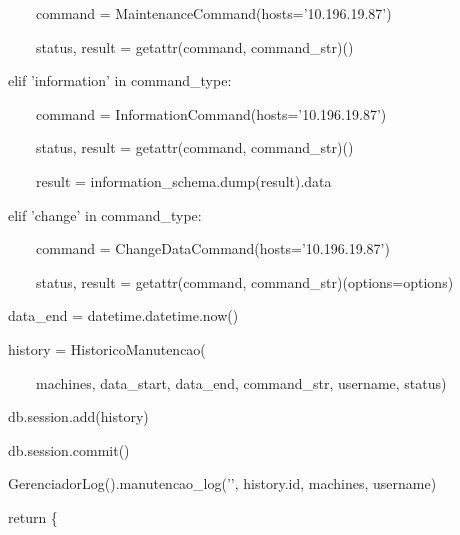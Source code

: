 {\ttfamily\color[rgb]{0.10980392,0.10980392,0.10980392}
    \ \ \ \ \ \ \ \ command = MaintenanceCommand(hosts='10.196.19.87')}

{\ttfamily\color[rgb]{0.10980392,0.10980392,0.10980392}
    \ \ \ \ \ \ \ \ status, result = getattr(command, command\_str)()}

{\ttfamily\color[rgb]{0.10980392,0.10980392,0.10980392}
    \ \ \ \ elif 'information' in command\_type:}

{\ttfamily\color[rgb]{0.10980392,0.10980392,0.10980392}
    \ \ \ \ \ \ \ \ command = InformationCommand(hosts='10.196.19.87')}

{\ttfamily\color[rgb]{0.10980392,0.10980392,0.10980392}
    \ \ \ \ \ \ \ \ status, result = getattr(command, command\_str)()}

{\ttfamily\color[rgb]{0.10980392,0.10980392,0.10980392}
    \ \ \ \ \ \ \ \ result = information\_schema.dump(result).data}

{\ttfamily\color[rgb]{0.10980392,0.10980392,0.10980392}
    \ \ \ \ elif 'change' in command\_type:}

{\ttfamily\color[rgb]{0.10980392,0.10980392,0.10980392}
    \ \ \ \ \ \ \ \ command = ChangeDataCommand(hosts='10.196.19.87')}

{\ttfamily\color[rgb]{0.10980392,0.10980392,0.10980392}
    \ \ \ \ \ \ \ \ status, result = getattr(command, command\_str)(options=options)}


    \bigskip

{\ttfamily\color[rgb]{0.10980392,0.10980392,0.10980392}
    \ \ \ \ data\_end = datetime.datetime.now()}


    \bigskip

{\ttfamily\color[rgb]{0.10980392,0.10980392,0.10980392}
    \ \ \ \ history = HistoricoManutencao(}

            {\ttfamily\color[rgb]{0.10980392,0.10980392,0.10980392}
            \ \ \ \ \ \ \ \ machines, data\_start, data\_end, command\_str, username, status)}

{\ttfamily\color[rgb]{0.10980392,0.10980392,0.10980392}
    \ \ \ \ db.session.add(history)}

{\ttfamily\color[rgb]{0.10980392,0.10980392,0.10980392}
    \ \ \ \ db.session.commit()}


    \bigskip

{\ttfamily\color[rgb]{0.10980392,0.10980392,0.10980392}
    \ \ \ \ GerenciadorLog().manutencao\_log('{}', history.id, machines, username)}

{\ttfamily\color[rgb]{0.10980392,0.10980392,0.10980392}
    \ \ \ \ return \{}

